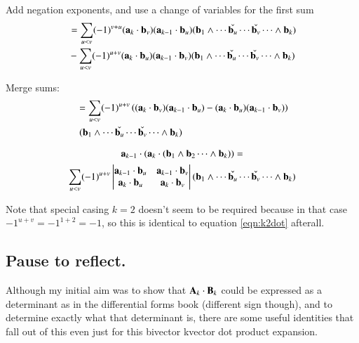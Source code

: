 \documentclass{article}      %
\begin{document}
Add negation exponents, and use a change of variables for the first sum
\begin{align*}
&= \sum_{u<v} (-1)^{v+u} (\mathbf{a}_k \cdot \mathbf{b}_v) (\mathbf{a}_{k-1} \cdot \mathbf{b}_u) (\mathbf{b}_1 \wedge \cdots \check{\mathbf{b}_u} \cdots \check{\mathbf{b}_v} \cdots \wedge \mathbf{b}_k) \\
&- \sum_{u<v} (-1)^{u+v} (\mathbf{a}_k \cdot \mathbf{b}_u) (\mathbf{a}_{k-1} \cdot \mathbf{b}_v) (\mathbf{b}_1 \wedge \cdots \check{\mathbf{b}_u} \cdots \check{\mathbf{b}_v} \cdots \wedge \mathbf{b}_k) \\
\end{align*}

Merge sums:
\begin{align*}
&= \sum_{u<v} (-1)^{u+v} 
\left(
(\mathbf{a}_k \cdot \mathbf{b}_v) (\mathbf{a}_{k-1} \cdot \mathbf{b}_u)
-(\mathbf{a}_k \cdot \mathbf{b}_u) (\mathbf{a}_{k-1} \cdot \mathbf{b}_v)
\right) \\
& \; (\mathbf{b}_1 \wedge \cdots \check{\mathbf{b}_u} \cdots \check{\mathbf{b}_v} \cdots \wedge \mathbf{b}_k)
\end{align*}

\begin{equation}\label{eqn:bivectordotkvector}
\mathbf{a}_{k-1} \cdot (\mathbf{a}_k \cdot (\mathbf{b}_1 \wedge \mathbf{b}_2 \cdots \wedge \mathbf{b}_k))
= 
\end{equation}
\begin{equation*}
\sum_{u<v} (-1)^{u+v} 
\begin{vmatrix}
\mathbf{a}_{k-1} \cdot \mathbf{b}_u & \mathbf{a}_{k-1} \cdot \mathbf{b}_v \\
\mathbf{a}_k \cdot \mathbf{b}_u & \mathbf{a}_k \cdot \mathbf{b}_v \\
\end{vmatrix}
(\mathbf{b}_1 \wedge \cdots \check{\mathbf{b}_u} \cdots \check{\mathbf{b}_v} \cdots \wedge \mathbf{b}_k) \\
\end{equation*}

Note that special casing $k=2$ doesn't seem to be required because in that
case $-1^{u+v} = -1^{1+2}=-1$, so this is identical to 
equation \ref{eqn:k2dot} afterall.

\subsection{ Pause to reflect. }

Although my initial aim was to show that $\mathbf{A}_k \cdot \mathbf{B}_k$ could be
expressed as a determinant as in the differential forms book (different
sign though), and to determine exactly what that determinant is, there
are some useful identities that fall out of this even just for this
bivector kvector dot product expansion.
\end{document}
